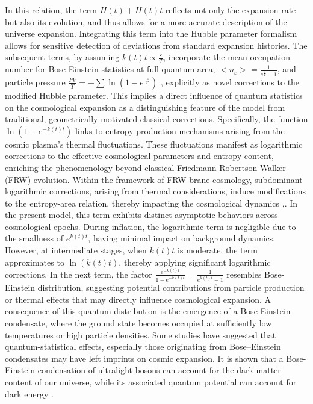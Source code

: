 \documentclass[12pt]{article}  %
\begin{document}
In this relation, the term $H(t) + \dot{H}(t)t$ reflects not only the expansion rate but also its evolution, and thus allows for a more accurate description of the universe expansion. Integrating this term into the Hubble parameter formalism allows for sensitive detection of deviations from standard expansion histories.
The subsequent terms, by assuming $k(t)t\propto\frac{\varepsilon}{T}$, incorporate the mean occupation number for Bose-Einstein statistics at full quantum area, $<n_\varepsilon>=\frac{1}{e^{\frac{\varepsilon}{T}}-1}$, and particle pressure $\frac{PV}{T}=-\sum \ln(1-e^{\frac{-\varepsilon}{T}})$ \cite{37}, explicitly as novel corrections to the modified Hubble parameter. This implies a direct influence of quantum statistics on the cosmological expansion as a distinguishing feature of the model from traditional, geometrically motivated classical corrections. Specifically, the function $\ln(1 - e^{-k(t)t})$ links to entropy production mechanisms arising from the cosmic plasma's thermal fluctuations. These fluctuations manifest as logarithmic corrections to the effective cosmological parameters and entropy content, enriching the phenomenology beyond classical Friedmann-Robertson-Walker (FRW) evolution. Within the framework of FRW brane cosmology, subdominant logarithmic corrections, arising from thermal considerations, induce modifications to the entropy-area relation, thereby impacting the cosmological dynamics \cite{38},\cite{39}. In the present model, this term exhibits distinct asymptotic behaviors across cosmological epochs. During inflation, the logarithmic term is negligible due to the smallness of $e^{k(t)t}$, having minimal impact on background dynamics. However, at intermediate stages, when $k(t)t$ is moderate, the term approximates to $\ln(k(t)t)$, thereby applying significant logarithmic corrections.
In the next term, the factor $\frac{e^{-k(t)t}}{1 - e^{-k(t)t}}=\frac{1}{e^{k(t)t}-1}$ resembles  Bose-Einstein distribution, suggesting potential contributions from particle production or thermal effects that may directly influence cosmological expansion. A consequence of this quantum distribution is the emergence of a Bose-Einstein condensate, where the ground state becomes  occupied at sufficiently low temperatures or high particle densities. Some studies have suggested that quantum-statistical effects, especially those originating from Bose--Einstein condensates may have left imprints on cosmic expansion. It is shown that a Bose-Einstein condensation of ultralight bosons can account for the dark matter content of our universe, while its associated quantum potential can account for dark energy \cite{40}. 
\end{document}
